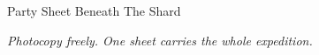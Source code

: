 \documentclass[10pt,a4paper,onecolumn]{scrartcl}
\begin{document}
\noindent
{\TitleFont\Large\color{shardink}Party Sheet}%
\hfill
{\GameSans\footnotesize\color{ash}Beneath The Shard}

\vspace{0.35em}
\noindent{\color{blood}\rule{\linewidth}{0.55pt}}

\vspace{-0.15em}


\vspace{0.4em}
\begin{center}
{\footnotesize\itshape Photocopy freely. One sheet carries the whole expedition.}
\end{center}
\end{document}
